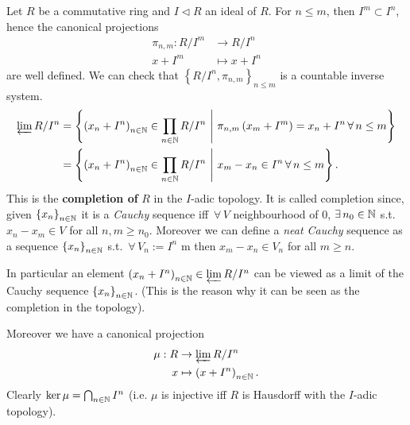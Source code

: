 \begin{ex}
	Let $R$ be a commutative ring and $I \triangleleft R$ an ideal of $R$.
	For $n \leq m$, then $I^m \subset I^n$, hence the canonical projections
	\begin{align}
		\pi_{n,m}: R/I^m &\to R/I^n \\
		x + I^m &\mapsto x + I^n
	\end{align} 
	are well defined.
	We can check that $\left\{ R/I^n, \pi_{n,m} \right\}_{n \leq m}$ is a countable inverse system.
	\begin{align}
		\varprojlim R/I^n &=
		\left\{ \left( x_n + I^n \right)_{n \in \N} \in \prod_{n \in \N} R/I^n \ \middle|\ 
		\pi_{n,m}\left( x_m + I^m \right) = x_n + I^n \,\forall\, n \leq m \right\}\\
				  &=
		\left\{ \left( x_n + I^n \right)_{n \in \N} \in \prod_{n \in \N} R/I^n \ \middle|\ 
		x_m - x_n \in I^n \,\forall\, n \leq m \right\}
	.\end{align} 
	This is the \textbf{completion of} $R$ in the $I$-adic topology.
	It is called completion since, given $\left\{ x_n \right\}_{n \in \mathbb{N}}$ it is a \textit{Cauchy} sequence iff
	$\,\forall\, V$ neighbourhood of $0$, $\exists\, n_0 \in \mathbb{N}$ s.t. $x_n - x_m \in V$ for all $n,m \geq n_0$.
	Moreover we can define a \textit{neat Cauchy} sequence as a sequence $\left\{ x_n \right\}_{n \in \mathbb{N}}$ s.t.
	$\,\forall\, V_n := I^n$ m then $x_m - x_n \in V_n$ for all $m \geq n$.

	In particular an element $\left( x_n + I^n \right)_{n \in \mathbb{N}} \in \varprojlim R/I^n$ can be viewed as a limit
	of the Cauchy sequence $\left\{ x_n \right\}_{n \in \mathbb{N}}$.
	(This is the reason why it can be seen as the completion in the topology).

	Moreover we have a canonical projection
	\begin{align}
		\mu: R &\to \varprojlim R/I^n \\
		x &\mapsto \left( x + I^n \right)_{n \in \mathbb{N}}
	.\end{align} 
	Clearly $\ker \mu = \bigcap_{n \in \mathbb{N}} I^n$ (i.e. $\mu$ is injective iff
	$R$ is Hausdorff with the $I$-adic topology).
\end{ex} 

